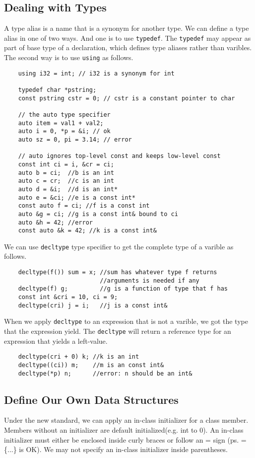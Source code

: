 \documentclass[11pt]{ctexart}
\begin{document}
\subsection{Dealing with Types}
A type alias is a name that is a synonym for another type. We can define a type alias in one of two ways. And one is to use \verb|typedef|. The \verb|typedef| may appear as part of base type of a declaration, which defines type aliases rather than varibles. The second way is to use \verb|using| as follows.
\begin{lstlisting}
    using i32 = int; // i32 is a synonym for int

    typedef char *pstring;
    const pstring cstr = 0; // cstr is a constant pointer to char

    // the auto type specifier
    auto item = val1 + val2;
    auto i = 0, *p = &i; // ok
    auto sz = 0, pi = 3.14; // error

    // auto ignores top-level const and keeps low-level const
    const int ci = i, &cr = ci;
    auto b = ci;  //b is an int
    auto c = cr;  //c is an int
    auto d = &i;  //d is an int*
    auto e = &ci; //e is a const int*
    const auto f = ci; //f is a const int
    auto &g = ci; //g is a const int& bound to ci
    auto &h = 42; //error
    const auto &k = 42; //k is a const int&
\end{lstlisting}\par
We can use \verb|decltype| type specifier to get the complete type of a varible as follows.
\begin{lstlisting}
    decltype(f()) sum = x; //sum has whatever type f returns
                           //arguments is needed if any
    decltype(f) g;         //g is a function of type that f has
    const int &cri = 10, ci = 9;
    decltype(cri) j = i;   //j is a const int&
\end{lstlisting}
When we apply \verb|decltype| to an expression that is not a varible, we got the type that the expression yield. The \verb|decltype| will return a reference type for an expression that yields a left-value.
\begin{lstlisting}
    decltype(cri + 0) k; //k is an int
    decltype((ci)) m;    //m is an const int&
    decltype(*p) n;      //error: n should be an int&
\end{lstlisting}
\subsection{Define Our Own Data Structures}
Under the new standard, we can apply an in-class initializer for a class member. Members without an initializer are default initialized(e.g. int to 0). An in-class initializer must either be enclosed inside curly braces or follow an = sign (ps. =\{...\} is OK). We may not specify an in-class initializer inside parentheses.
\end{document}
